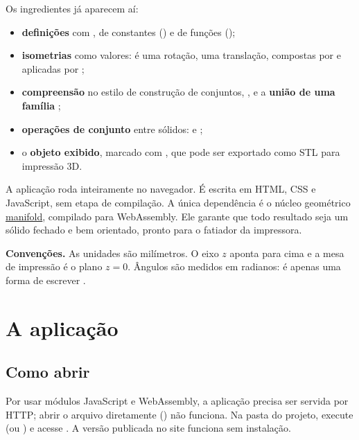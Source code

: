 
Os ingredientes já aparecem aí:
\begin{itemize}
  \item \textbf{definições} com , de constantes () e de funções ();
  \item \textbf{isometrias} como valores:  é uma rotação,  uma translação, compostas por  e aplicadas por ;
  \item \textbf{compreensão} no estilo de construção de conjuntos, , e a \textbf{união de uma família} ;
  \item \textbf{operações de conjunto} entre sólidos:  e ;
  \item o \textbf{objeto exibido}, marcado com , que pode ser exportado como STL para impressão 3D.
\end{itemize}

A aplicação roda inteiramente no navegador. É escrita em HTML, CSS e JavaScript, sem etapa de compilação.
A única dependência é o núcleo geométrico \href{https://github.com/elalish/manifold}{manifold}, compilado para WebAssembly.
Ele garante que todo resultado seja um sólido fechado e bem orientado, pronto para o fatiador da impressora.

\begin{nota}
\textsf{\textbf{Convenções.}} As unidades são milímetros. O eixo $z$ aponta para cima e a mesa de impressão é o plano $z = 0$.
Ângulos são medidos em radianos:  é apenas uma forma de escrever .
\end{nota}

\section{A aplicação}\label{sec:interface}

\subsection{Como abrir}
Por usar módulos JavaScript e WebAssembly, a aplicação precisa ser servida por HTTP; abrir o arquivo
 diretamente () não funciona. Na pasta do projeto, execute
 (ou ) e acesse .
A versão publicada no site funciona sem instalação.

